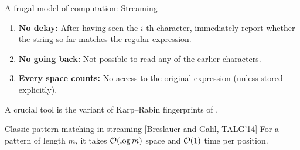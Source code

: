 \begin{frame}{A frugal model of computation: Streaming}
\smallskip
\pause
\begin{enumerate}
\item \textbf{No delay:} After having seen the $i$-th character, immediately report whether the string so far matches the regular expression.
\pause
\item \textbf{No going back:} Not possible to read any of the earlier characters.
\pause
\item \textbf{Every space counts:} No access to the original expression (unless stored explicitly).
\end{enumerate}
\pause
\begin{center}
    \small
    A crucial  tool is the variant of Karp--Rabin fingerprints of .
\end{center}\pause
\begin{mylemblock}{Classic pattern matching in streaming [Breslauer and Galil, TALG'14]}
    For a pattern of length $m$, it takes $\mathcal{O}(\log m)$ space and $\mathcal{O}(1)$ time per position.
\end{mylemblock}

\end{frame}

